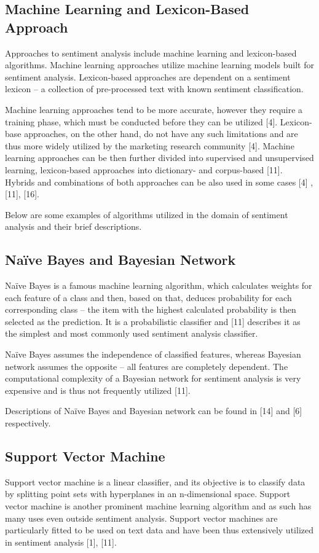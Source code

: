 \documentclass[12pt,journal,compsoc]{IEEEtran}
\begin{document}
\subsection{Machine Learning and Lexicon-Based Approach}
Approaches to sentiment analysis include machine learning and lexicon-based algorithms. Machine learning approaches utilize machine learning models built for sentiment analysis. Lexicon-based approaches are dependent on a sentiment lexicon – a collection of pre-processed text with known sentiment classification.

Machine learning approaches tend to be more accurate, however they require a training phase, which must be conducted before they can be utilized [4]. Lexicon-base approaches, on the other hand, do not have any such limitations and are thus more widely utilized by the marketing research community [4]. Machine learning approaches can be then further divided into supervised and unsupervised learning, lexicon-based approaches into dictionary- and corpus-based [11]. Hybrids and combinations of both approaches can be also used in some cases [4] , [11], [16].

Below are some examples of algorithms utilized in the domain of sentiment analysis and their brief descriptions.

\subsection{Naïve Bayes and Bayesian Network}
Naïve Bayes is a famous machine learning algorithm, which calculates weights for each feature of a class and then, based on that, deduces probability for each corresponding class – the item with the highest calculated probability is then selected as the prediction. It is a probabilistic classifier and [11] describes it as the simplest and most commonly used sentiment analysis classifier.

Naïve Bayes assumes the independence of classified features, whereas Bayesian network assumes the opposite – all features are completely dependent. The computational complexity of a Bayesian network for sentiment analysis is very expensive and is thus not frequently utilized [11].

Descriptions of Naïve Bayes and Bayesian network can be found in [14] and [6] respectively.

\subsection{Support Vector Machine}
Support vector machine is a linear classifier, and its objective is to classify data by splitting point sets with hyperplanes in an n-dimensional space. Support vector machine is another prominent machine learning algorithm and as such has many uses even outside sentiment analysis. Support vector machines are particularly fitted to be used on text data and have been thus extensively utilized in sentiment analysis [1], [11].
\end{document}
